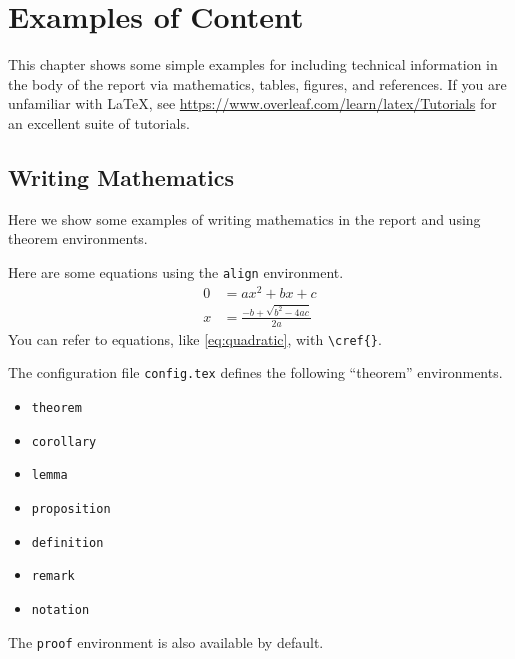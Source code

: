\chapter{Examples of Content}
\label{chapter:examples}

This chapter shows some simple examples for including technical information in the body of the report via mathematics, tables, figures, and references.
If you are unfamiliar with \LaTeX{}, see \url{https://www.overleaf.com/learn/latex/Tutorials} for an excellent suite of tutorials.

\section{Writing Mathematics} %

Here we show some examples of writing mathematics in the report and using theorem environments.

Here are some equations using the \texttt{align} environment.
\begin{align}
    \label{eq:quadratic}
    0
    &= ax^{2} + bx + c
    \\
    \label{eq:quadraticroots}
    x
    &= \frac{-b + \sqrt{b^{2} - 4ac}}{2a}
\end{align}
You can refer to equations, like \cref{eq:quadratic}, with \verb+\cref{}+.

The configuration file \texttt{config.tex} defines the following ``theorem'' environments.
\begin{itemize}
    \item \texttt{theorem}
    \item \texttt{corollary}
    \item \texttt{lemma}
    \item \texttt{proposition}
    \item \texttt{definition}
    \item \texttt{remark}
    \item \texttt{notation}
\end{itemize}
The \texttt{proof} environment is also available by default.


